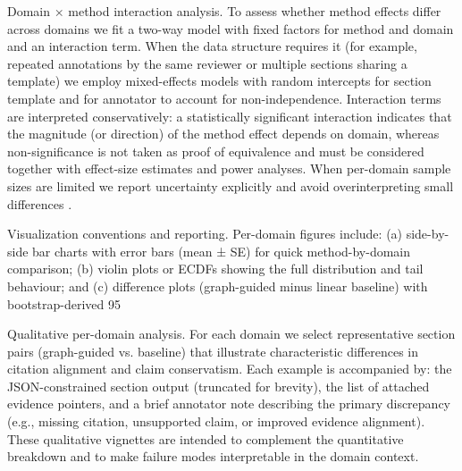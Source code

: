 \documentclass{article}%
\begin{document}
Domain × method interaction analysis. To assess whether method effects differ across domains we fit a two-way model with fixed factors for method and domain and an interaction term. When the data structure requires it (for example, repeated annotations by the same reviewer or multiple sections sharing a template) we employ mixed-effects models with random intercepts for section template and for annotator to account for non-independence. Interaction terms are interpreted conservatively: a statistically significant interaction indicates that the magnitude (or direction) of the method effect depends on domain, whereas non-significance is not taken as proof of equivalence and must be considered together with effect-size estimates and power analyses. When per-domain sample sizes are limited we report uncertainty explicitly and avoid overinterpreting small differences \cite{web_gros_2025_per_domain_generalizing_policies_on_validation_i}.

Visualization conventions and reporting. Per-domain figures include: (a) side-by-side bar charts with error bars (mean ± SE) for quick method-by-domain comparison; (b) violin plots or ECDFs showing the full distribution and tail behaviour; and (c) difference plots (graph-guided minus linear baseline) with bootstrap-derived 95%

Qualitative per-domain analysis. For each domain we select representative section pairs (graph-guided vs. baseline) that illustrate characteristic differences in citation alignment and claim conservatism. Each example is accompanied by: the JSON-constrained section output (truncated for brevity), the list of attached evidence pointers, and a brief annotator note describing the primary discrepancy (e.g., missing citation, unsupported claim, or improved evidence alignment). These qualitative vignettes are intended to complement the quantitative breakdown and to make failure modes interpretable in the domain context.
\end{document}
